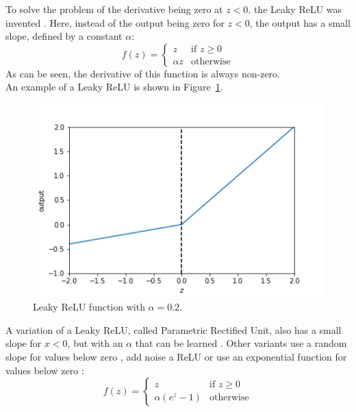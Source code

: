 To solve the problem of the derivative being zero at $z<0$, the Leaky ReLU was invented \parencite{maas2013rectifier}. Here, instead of the output being zero for $z<0$, the output has a small slope, defined by a constant $\alpha$:
\begin{equation}
    f(z) = \begin{cases}
        z & \text{if $z \ge 0$}\\
        \alpha z & \text{otherwise}
        \end{cases}
\end{equation}
As can be seen, the derivative of this function is always non-zero.\\
An example of a Leaky ReLU is shown in Figure~\ref{fig:lrelu}.\\
\begin{figure}[htb]
    \centering
    \includegraphics[width=.8\linewidth]{images/activation_functions/lrelu.png}
    \caption[Leaky ReLU function]{Leaky ReLU function with $\alpha = 0.2$.}
    \label{fig:lrelu}
\end{figure}

A variation of a Leaky ReLU, called Parametric Rectified Unit, also has a small slope for $x<0$, but with an $\alpha$ that can be learned \parencite{journals/corr/HeZR015}. Other variants use a random slope for values below zero \parencite{journals/corr/XuWCL15}, add noise a ReLU \parencite{conf/icml/NairH10} or use an exponential function for values below zero \parencite{journals/corr/ClevertUH15}:
\begin{equation}
    f(z) = \begin{cases}
        z & \text{if $z \ge 0$}\\
        \alpha (e^z-1) & \text{otherwise}
        \end{cases}
\end{equation}

